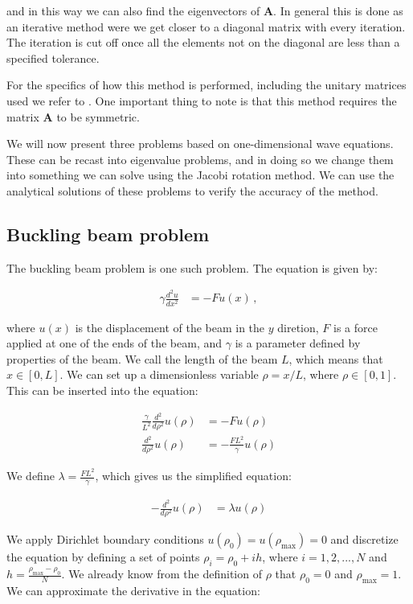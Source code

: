 \documentclass[reprint,english,notitlepage]{revtex4-1}  %
\begin{document}
and in this way we can also find the eigenvectors of \textbf{A}. In general this is done as an iterative method were we get closer to a diagonal matrix with every iteration. The iteration is cut off once all the elements not on the diagonal are less than a specified tolerance. 

For the specifics of how this method is performed, including the unitary matrices used we refer to \citep{Hjorth-Jensen2015}. One important thing to note is that this method requires the matrix \textbf{A} to be symmetric. 

We will now present three problems based on one-dimensional wave equations. These can be recast into eigenvalue problems, and in doing so we change them into something we can solve using the Jacobi rotation method. We can use the analytical solutions of these problems to verify the accuracy of the method.


\subsection{Buckling beam problem} \label{sec:II:c}

The buckling beam problem is one such problem. The equation is given by:

\begin{align*}
\gamma \frac{d^2 u }{dx^2} &= -Fu(x) \, ,
\end{align*}

where $u(x)$ is the displacement of the beam in the $y$ diretion, $F$ is a force applied at one of the ends of the beam, and $\gamma$ is a parameter defined by properties of the beam. We call the length of the beam $L$, which means that $x\in [0,L]$. We can set up a dimensionless variable $\rho = x/L$, where $\rho \in [0,1]$. This can be inserted into the equation:

\begin{align*}
\frac{\gamma}{L^2} \frac{d^2  }{d\rho^2} u(\rho) &= -Fu(\rho) \\
\frac{d^2}{d\rho^2} u(\rho) &= -\frac{FL^2}{\gamma} u(\rho)
\end{align*}

We define $\lambda = \frac{FL^2}{\gamma}$, which gives us the simplified equation:

\begin{align*}
- \frac{d^2}{d\rho^2} u(\rho) &= \lambda u (\rho)
\end{align*}

We apply Dirichlet boundary conditions $u(\rho_0) = u(\rho_\text{max}) = 0$ and discretize the equation by defining a set of points $\rho_i = \rho_0 + ih$, where $i = 1,2,...,N$ and $h = \frac{\rho_\text{max} - \rho_0}{N}$. We already know from the definition of $\rho$ that $\rho_0 = 0$ and $\rho_\text{max} = 1$. We can approximate the derivative in the equation:
\end{document}
